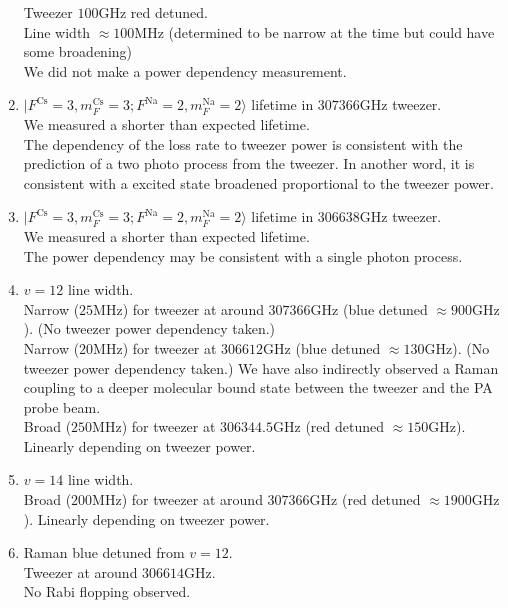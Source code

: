 \documentclass[10pt,fleqn]{article}
\begin{document}
\begin{enumerate}
  Tweezer $100 \mathrm{GHz}$ red detuned.\\
  Line width $\approx 100 \mathrm{MHz}$
  (determined to be narrow at the time but could have some broadening)\\
  We did not make a power dependency measurement.
\item $|F^{\mathrm{Cs}}\!=\!3, m_{F}^{\mathrm{Cs}}\!=\!3; F^{\mathrm{Na}}\!=\!2, m_{F}^{\mathrm{Na}}\!=\!2\rangle$ lifetime
  in $307366 \mathrm{GHz}$ tweezer.\\
  We measured a shorter than expected lifetime.\\
  The dependency of the loss rate to tweezer power is consistent with the prediction of
  a two photo process from the tweezer. In another word, it is consistent with
  a excited state broadened proportional to the tweezer power.
\item $|F^{\mathrm{Cs}}\!=\!3, m_{F}^{\mathrm{Cs}}\!=\!3; F^{\mathrm{Na}}\!=\!2, m_{F}^{\mathrm{Na}}\!=\!2\rangle$ lifetime
  in $306638 \mathrm{GHz}$ tweezer.\\
  We measured a shorter than expected lifetime.\\
  The power dependency may be consistent with a single photon process.
\item $v=12$ line width.\\
  Narrow ($25 \mathrm{MHz}$) for tweezer at around $307366 \mathrm{GHz}$
  (blue detuned $\approx 900\mathrm{GHz}$). (No tweezer power dependency taken.)\\
  Narrow ($20 \mathrm{MHz}$) for tweezer at $306612 \mathrm{GHz}$
  (blue detuned $\approx 130\mathrm{GHz}$). (No tweezer power dependency taken.)
  We have also indirectly observed a Raman coupling to a deeper molecular bound state
  between the tweezer and the PA probe beam.\\
  Broad ($250 \mathrm{MHz}$) for tweezer at $306344.5 \mathrm{GHz}$
  (red detuned $\approx 150\mathrm{GHz}$). Linearly depending on tweezer power.\\
\item $v=14$ line width.\\
  Broad ($200 \mathrm{MHz}$) for tweezer at around $307366 \mathrm{GHz}$
  (red detuned $\approx 1900\mathrm{GHz}$). Linearly depending on tweezer power.\\
\item Raman blue detuned from $v=12$.\\
  Tweezer at around $306614 \mathrm{GHz}$.\\
  No Rabi flopping observed.
\end{enumerate}
\end{document}
